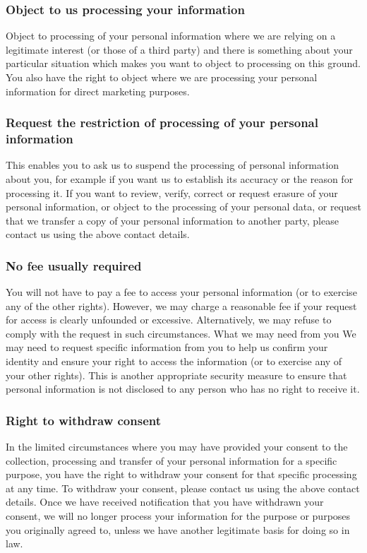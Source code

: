 \documentclass[12pt]{article}
\begin{document}
\subsubsection*{Object to us processing your information}
Object to processing of your personal information where we are relying on a legitimate interest (or those of a third party) and there is something about your particular situation which makes you want to object to processing on this ground. You also have the right to object where we are processing your personal information for direct marketing purposes.

\subsubsection*{Request the restriction of processing of your personal information}
This enables you to ask us to suspend the processing of personal information about you, for example if you want us to establish its accuracy or the reason for processing it. 
If you want to review, verify, correct or request erasure of your personal information, or object to the processing of your personal data, or request that we transfer a copy of your personal information to another party, please contact us using the above contact details.

\subsubsection*{No fee usually required}

You will not have to pay a fee to access your personal information (or to exercise any of the other rights). However, we may charge a reasonable fee if your request for access is clearly unfounded or excessive. Alternatively, we may refuse to comply with the request in such circumstances.
What we may need from you
We may need to request specific information from you to help us confirm your identity and ensure your right to access the information (or to exercise any of your other rights). This is another appropriate security measure to ensure that personal information is not disclosed to any person who has no right to receive it.

\subsubsection*{Right to withdraw consent}

In the limited circumstances where you may have provided your consent to the collection, processing and transfer of your personal information for a specific purpose, you have the right to withdraw your consent for that specific processing at any time. To withdraw your consent, please contact us using the above contact details.  Once we have received notification that you have withdrawn your consent, we will no longer process your information for the purpose or purposes you originally agreed to, unless we have another legitimate basis for doing so in law.
\end{document}
